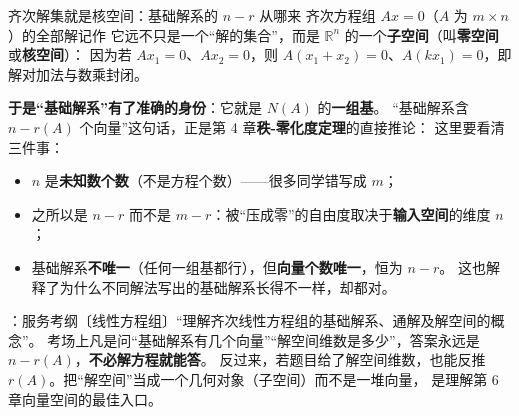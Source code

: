 %





\begin{fdeep}{齐次解集就是核空间：基础解系的 $n-r$ 从哪来}
齐次方程组 $Ax=0$（$A$ 为 $m\times n$）的全部解记作
它远不只是一个“解的集合”，而是 $\mathbb{R}^{n}$ 的一个\textbf{子空间}（叫\textbf{零空间}或\textbf{核空间}）：
因为若 $Ax_1=0$、$Ax_2=0$，则 $A(x_1+x_2)=0$、$A(kx_1)=0$，即解对加法与数乘封闭。

\medskip
\textbf{于是“基础解系”有了准确的身份}：它就是 $N(A)$ 的\textbf{一组基}。
“基础解系含 $n-r(A)$ 个向量”这句话，正是第 4 章\textbf{秩-零化度定理}的直接推论：
这里要看清三件事：
\begin{itemize}[leftmargin=2.2em,itemsep=0.25em]
\item $n$ 是\textbf{未知数个数}（不是方程个数）——很多同学错写成 $m$；
\item 之所以是 $n-r$ 而不是 $m-r$：被“压成零”的自由度取决于\textbf{输入空间}的维度 $n$；
\item 基础解系\textbf{不唯一}（任何一组基都行），但\textbf{向量个数唯一}，恒为 $n-r$。
      这也解释了为什么不同解法写出的基础解系长得不一样，却都对。
\end{itemize}
\fbref{}：服务考纲〔线性方程组〕“理解齐次线性方程组的基础解系、通解及解空间的概念”。
考场上凡是问“基础解系有几个向量”“解空间维数是多少”，答案永远是 $n-r(A)$，\textbf{不必解方程就能答}。
反过来，若题目给了解空间维数，也能反推 $r(A)$。把“解空间”当成一个几何对象（子空间）而不是一堆向量，
是理解第 6 章向量空间的最佳入口。
\end{fdeep}

